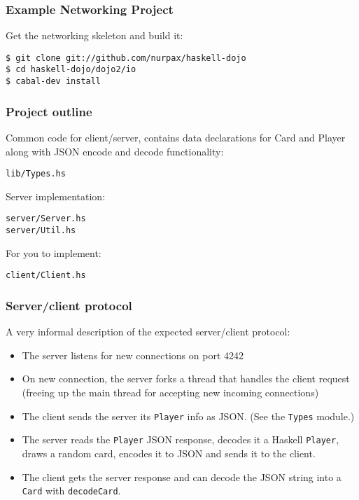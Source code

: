 \documentclass{beamer}
\begin{document}
\begin{frame}[fragile]
\frametitle{Example Networking Project}

Get the networking skeleton and build it:

\begin{verbatim}
$ git clone git://github.com/nurpax/haskell-dojo
$ cd haskell-dojo/dojo2/io
$ cabal-dev install
\end{verbatim}

\end{frame}


\begin{frame}[fragile]
\frametitle{Project outline}

Common code for client/server, contains data declarations for Card and
Player along with JSON encode and decode functionality:

\begin{verbatim}
lib/Types.hs
\end{verbatim}

Server implementation:

\begin{verbatim}
server/Server.hs
server/Util.hs
\end{verbatim}

For you to implement:

\begin{verbatim}
client/Client.hs
\end{verbatim}

\end{frame}

\begin{frame}[fragile]
\frametitle{Server/client protocol}

A very informal description of the expected server/client protocol:

\begin{itemize}
  \item The server listens for new connections on port 4242
  \item On new connection, the server forks a thread that handles the
    client request (freeing up the main thread for accepting new
    incoming connections)
  \item The client sends the server its \verb+Player+ info as
    JSON.  (See the \verb+Types+ module.)
  \item The server reads the \verb+Player+ JSON response, decodes it a
    Haskell \verb+Player+, draws a random card, encodes it to JSON and
    sends it to the client.
  \item The client gets the server response and can decode the JSON
    string into a \verb+Card+ with \verb+decodeCard+.
\end{itemize}

\end{frame}
\end{document}
